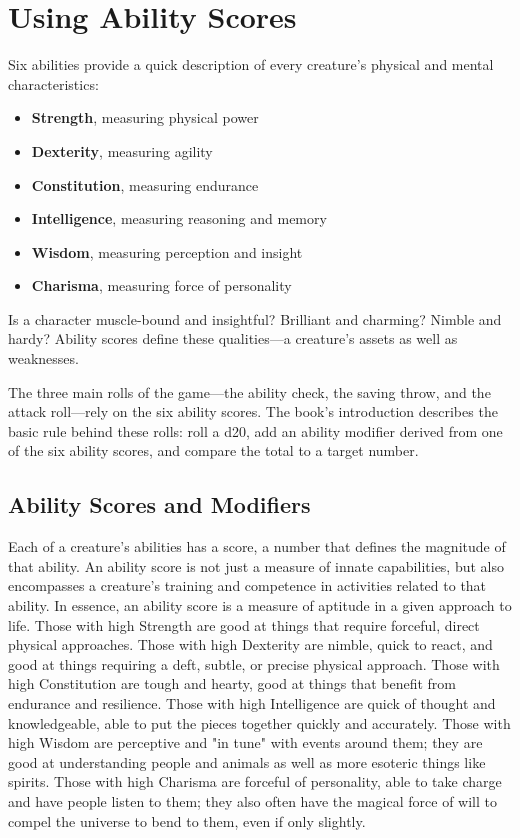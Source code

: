 \chapter{Using Ability Scores}
\label{ch:using-ability-scores}
Six abilities provide a quick description of every creature's physical and mental characteristics:

\begin{itemize}
\item \textbf{Strength}, measuring physical power
\item \textbf{Dexterity}, measuring agility
\item \textbf{Constitution}, measuring endurance
\item \textbf{Intelligence}, measuring reasoning and memory
\item \textbf{Wisdom}, measuring perception and insight
\item \textbf{Charisma}, measuring force of personality
\end{itemize}

Is a character muscle-bound and insightful? Brilliant and charming? Nimble and hardy? Ability scores define these qualities—a creature's assets as well as weaknesses.

The three main rolls of the game—the ability check, the saving throw, and the attack roll—rely on the six ability scores. The book's introduction describes the basic rule behind these rolls: roll a d20, add an ability modifier derived from one of the six ability scores, and compare the total to a target number.

\section{Ability Scores and Modifiers}

Each of a creature's abilities has a score, a number that defines the magnitude of that ability. An ability score is not just a measure of innate capabilities, but also encompasses a creature's training and competence in activities related to that ability. In essence, an ability score is a measure of aptitude in a given approach to life. Those with high Strength are good at things that require forceful, direct physical approaches. Those with high Dexterity are nimble, quick to react, and good at things requiring a deft, subtle, or precise physical approach. Those with high Constitution are tough and hearty, good at things that benefit from endurance and resilience. Those with high Intelligence are quick of thought and knowledgeable, able to put the pieces together quickly and accurately. Those with high Wisdom are perceptive and "in tune" with events around them; they are good at understanding people and animals as well as more esoteric things like spirits. Those with high Charisma are forceful of personality, able to take charge and have people listen to them; they also often have the magical force of will to compel the universe to bend to them, even if only slightly.

